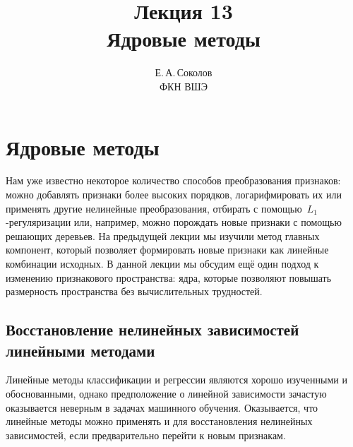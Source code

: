 \documentclass[12pt,fleqn]{article}
\begin{document}
\title{Лекция 13\\Ядровые методы}
\author{Е.\,А.\,Соколов\\ФКН ВШЭ}
\maketitle

\section{Ядровые методы}

Нам уже известно некоторое количество способов преобразования признаков:
можно добавлять признаки более высоких порядков, логарифмировать их или применять
другие нелинейные преобразования, отбирать с помощью~$L_1$-регуляризации
или, например, можно порождать новые признаки с помощью решающих деревьев.
На предыдущей лекции мы изучили метод главных компонент, который позволяет
формировать новые признаки как линейные комбинации исходных.
В данной лекции мы обсудим ещё один подход к изменению признакового пространства:
ядра, которые позволяют повышать размерность пространства без вычислительных трудностей.

\subsection{Восстановление нелинейных зависимостей линейными методами}
Линейные методы классификации и регрессии являются хорошо изученными
и обоснованными, однако предположение о линейной зависимости
зачастую оказывается неверным в задачах машинного обучения.
Оказывается, что линейные методы можно применять и для восстановления
нелинейных зависимостей, если предварительно перейти к новым признакам.
\end{document}
